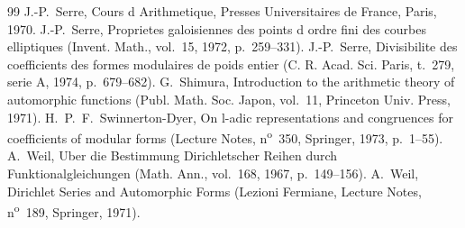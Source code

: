 \documentclass[11pt]{amsart}
\theoremstyle{plain}
\theoremstyle{definition}
\theoremstyle{remark}
\begin{document}
\begin{thebibliography}{99}
 J.-P.~Serre, Cours d Arithmetique, Presses Universitaires de France, Paris, 1970.
 J.-P.~Serre, Proprietes galoisiennes des points d ordre fini des courbes elliptiques (Invent. Math., vol.~15, 1972, p.~259--331).
 J.-P.~Serre, Divisibilite des coefficients des formes modulaires de poids entier (C. R. Acad. Sci. Paris, t.~279, serie A, 1974, p.~679--682).
 G.~Shimura, Introduction to the arithmetic theory of automorphic functions (Publ. Math. Soc. Japon, vol.~11, Princeton Univ. Press, 1971).
 H.~P.~F.~Swinnerton-Dyer, On l-adic representations and congruences for coefficients of modular forms (Lecture Notes, n\textsuperscript{o}~350, Springer, 1973, p.~1--55).
 A.~Weil, Uber die Bestimmung Dirichletscher Reihen durch Funktionalgleichungen (Math. Ann., vol.~168, 1967, p.~149--156).
 A.~Weil, Dirichlet Series and Automorphic Forms (Lezioni Fermiane, Lecture Notes, n\textsuperscript{o}~189, Springer, 1971).
\end{thebibliography}
\end{document}
